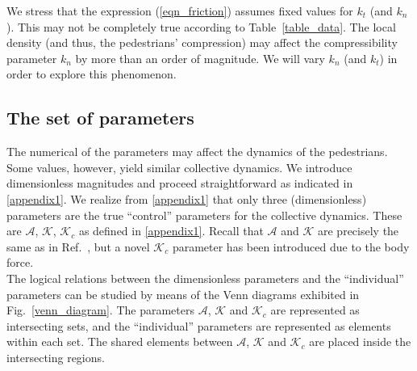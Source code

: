 \documentclass[preprint,12pt]{elsarticle}
\begin{document}
We stress that the expression (\ref{eqn_friction}) assumes fixed values for 
$k_t$ (and $k_n$). This may not be completely true according to 
Table~\ref{table_data}. The local density (and thus, the pedestrians' 
compression) may affect the compressibility parameter $k_n$ by more than an order 
of magnitude. We will vary $k_n$ (and $k_t$) in order to explore this 
phenomenon. \\  


\subsection{The set of parameters}

The numerical of the parameters may affect the dynamics of the 
pedestrians. Some values, however, yield similar collective dynamics.
We introduce dimensionless magnitudes 
and proceed straightforward as indicated in \ref{appendix1}. We realize from 
\ref{appendix1} that only three (dimensionless) parameters  are the true 
``control'' parameters for the collective dynamics. These are $\mathcal{A}$, 
$\mathcal{K}$, $\mathcal{K}_c$ as defined in \ref{appendix1}. Recall that 
$\mathcal{A}$ and $\mathcal{K}$ are precisely the same as in 
Ref.~\cite{dorso_2019}, but a novel $\mathcal{K}_c$ parameter has been 
introduced due to the body force.   \\

The logical relations between the dimensionless parameters and the ``individual'' 
parameters can be studied by means of the Venn diagrams exhibited in 
Fig.~\ref{venn_diagram}. The parameters $\mathcal{A}$, $\mathcal{K}$ and 
$\mathcal{K}_c$ are represented as intersecting sets, and the ``individual'' 
parameters are represented as elements within each set. The shared elements 
between $\mathcal{A}$, $\mathcal{K}$ and $\mathcal{K}_c$ are placed inside the 
intersecting regions. \\
\end{document}
